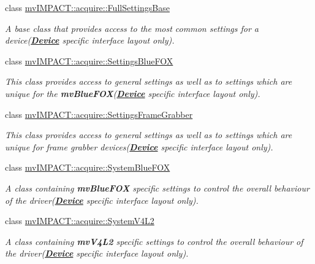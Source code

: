 \begin{DoxyCompactItemize}
class \hyperlink{classmv_i_m_p_a_c_t_1_1acquire_1_1_full_settings_base}{mv\+I\+M\+P\+A\+C\+T\+::acquire\+::\+Full\+Settings\+Base}
\begin{DoxyCompactList}\small\item\em A base class that provides access to the most common settings for a device({\bfseries \hyperlink{classmv_i_m_p_a_c_t_1_1acquire_1_1_device}{Device}} specific interface layout only). \end{DoxyCompactList}\item 
class \hyperlink{classmv_i_m_p_a_c_t_1_1acquire_1_1_settings_blue_f_o_x}{mv\+I\+M\+P\+A\+C\+T\+::acquire\+::\+Settings\+Blue\+F\+O\+X}
\begin{DoxyCompactList}\small\item\em This class provides access to general settings as well as to settings which are unique for the {\bfseries mv\+Blue\+F\+O\+X}({\bfseries \hyperlink{classmv_i_m_p_a_c_t_1_1acquire_1_1_device}{Device}} specific interface layout only). \end{DoxyCompactList}\item 
class \hyperlink{classmv_i_m_p_a_c_t_1_1acquire_1_1_settings_frame_grabber}{mv\+I\+M\+P\+A\+C\+T\+::acquire\+::\+Settings\+Frame\+Grabber}
\begin{DoxyCompactList}\small\item\em This class provides access to general settings as well as to settings which are unique for frame grabber devices({\bfseries \hyperlink{classmv_i_m_p_a_c_t_1_1acquire_1_1_device}{Device}} specific interface layout only). \end{DoxyCompactList}\item 
class \hyperlink{classmv_i_m_p_a_c_t_1_1acquire_1_1_system_blue_f_o_x}{mv\+I\+M\+P\+A\+C\+T\+::acquire\+::\+System\+Blue\+F\+O\+X}
\begin{DoxyCompactList}\small\item\em A class containing {\bfseries mv\+Blue\+F\+O\+X} specific settings to control the overall behaviour of the driver({\bfseries \hyperlink{classmv_i_m_p_a_c_t_1_1acquire_1_1_device}{Device}} specific interface layout only). \end{DoxyCompactList}\item 
class \hyperlink{classmv_i_m_p_a_c_t_1_1acquire_1_1_system_v4_l2}{mv\+I\+M\+P\+A\+C\+T\+::acquire\+::\+System\+V4\+L2}
\begin{DoxyCompactList}\small\item\em A class containing {\bfseries mv\+V4\+L2} specific settings to control the overall behaviour of the driver({\bfseries \hyperlink{classmv_i_m_p_a_c_t_1_1acquire_1_1_device}{Device}} specific interface layout only). \end{DoxyCompactList}\end{DoxyCompactItemize}
